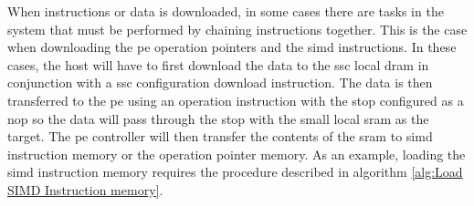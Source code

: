 When instructions or data is downloaded, in some cases there are tasks in the system that must be performed by chaining instructions together.
This is the case when downloading the \ac{pe} operation pointers and the \ac{simd} instructions.
In these cases, the host will have to first download the data to the \ac{ssc} local \ac{dram} in conjunction with a \ac{ssc} configuration download instruction.
The data is then transferred to the \ac{pe} using an operation instruction with the \ac{stop} configured as a \ac{nop} so the data will pass through the \ac{stop} with the small local \ac{sram} as the target. 
The \ac{pe} controller will then transfer the contents of the \ac{sram} to \ac{simd} instruction memory or the operation pointer memory.
As an example, loading the \ac{simd} instruction memory requires the procedure described in algorithm \ref{alg:Load SIMD Instruction memory}.

